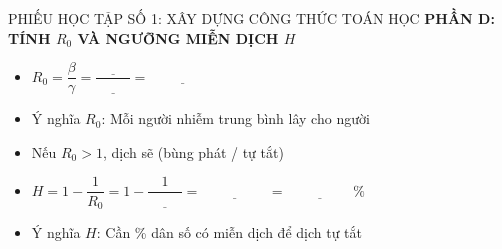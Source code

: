 \documentclass[12pt,a4paper]{article}
\begin{document}
\begin{phieuhoctap}{PHIẾU HỌC TẬP SỐ 1: XÂY DỰNG CÔNG THỨC TOÁN HỌC}
\vspace{0.3cm}
\textbf{\color{mathblue} PHẦN D: TÍNH $R_0$ VÀ NGƯỠNG MIỄN DỊCH $H$}
\begin{itemize}
\item $R_0 = \dfrac{\beta}{\gamma} = \dfrac{\underline{\hspace{1cm}}}{\underline{\hspace{1cm}}} = \underline{\hspace{2cm}}$
\item Ý nghĩa $R_0$: Mỗi người nhiễm trung bình lây cho \underline{\hspace{2cm}} người
\item Nếu $R_0 > 1$, dịch sẽ \underline{\hspace{4cm}} (bùng phát / tự tắt)
\item $H = 1 - \dfrac{1}{R_0} = 1 - \dfrac{1}{\underline{\hspace{1cm}}} = \underline{\hspace{2cm}} = \underline{\hspace{2cm}}\%$
\item Ý nghĩa $H$: Cần \underline{\hspace{2cm}}\% dân số có miễn dịch để dịch tự tắt
\end{itemize}

\end{phieuhoctap}
\end{document}
